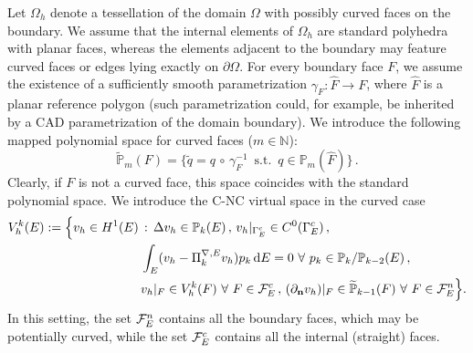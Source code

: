 \documentclass[a4paper,11pt]{article}
\theoremstyle{remark}
\theoremstyle{definition}
\newcommand{\Pol}{\mathbb{P}}
\newcommand{\PiNablaE}{\Pi^{\nabla,E}_k}
\begin{document}
Let $\Omega_h$ denote a tessellation of the domain $\Omega$ with possibly curved faces on the boundary. 
We assume that the internal elements of $\Omega_h$ are standard polyhedra with planar faces, whereas the elements adjacent to the boundary may feature curved faces or edges lying exactly on $\partial \Omega$.
For every boundary face $F$, we assume the existence of a sufficiently smooth parametrization $\gamma_F: \widehat{F} \to F$, where $\widehat{F}$ is a planar reference polygon (such parametrization could, for example, be inherited by a CAD parametrization of the domain boundary).
We introduce the following mapped polynomial space for curved faces ($m \in {\mathbb N}$):
\[
\widetilde{\mathbb P}_m(F) 
= 
\{
\widetilde q = q \, \circ \, \gamma_F^{-1} \, \text{ s.t. }\, q \in \mathbb P_m(\widehat{F})
\} \, .
\]
Clearly, if $F$ is not a curved face, this space coincides with the standard polynomial space.
%
We introduce the C-NC virtual space in the curved case
\begin{equation}\label{pokeball2}
\begin{aligned}
V_h^k(E) := \Big\{ v_h \in H^1(E)\, & :\, \Delta v_h \in \Pol_{k}(E) \, , \, 
v_h|_{\Gamma^{c}_E} \in C^0(\Gamma^{c}_E) \, , \\
& \int_E (v_h-\PiNablaE v_h) p_k \,{\rm d}E = 0 \ \forall \ p_k \in \Pol_k/\Pol_{k-2}(E) \, , \\
&v_h|_F \in V_h^k(F) \ \forall \ F \in {\cal F}^c_E \, , \,
(\partial_{{\bf n}} v_h)|_F \in \widetilde{\Pol}_{k-1}(F) \ \forall \ F \in {\cal F}^n_E  \Big\} .
\end{aligned}
\end{equation}
In this setting, the set ${\cal F}^n_E$ contains all the boundary faces, which may be potentially curved, while the set ${\cal F}^c_E$ contains all the internal (straight) faces.
\end{document}
